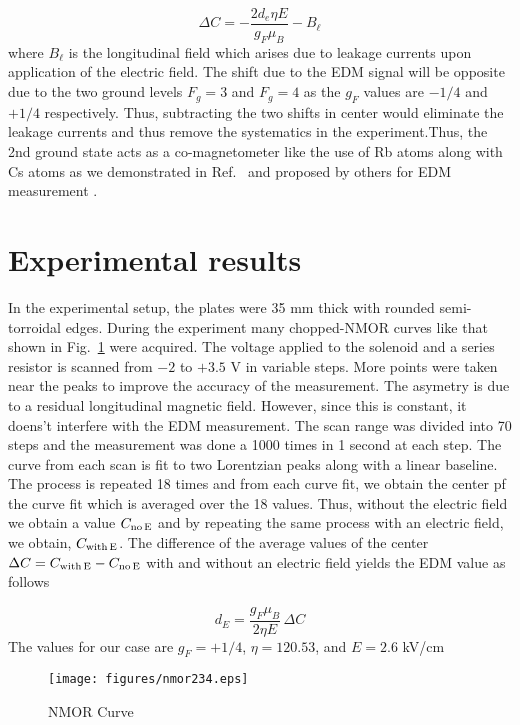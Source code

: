 \begin{equation*}
\Delta C = - \dfrac{2 d_e \eta E}{g_F \mu_B} - B_\ell
\end{equation*}
where $B_\ell$ is the longitudinal field which arises due to leakage currents upon application of the electric field. The shift due to the EDM signal will be opposite due to the two ground levels $F_g=3$ and $F_g=4$ as the $ g_F $ values are $-1/4$ and $+1/4$ respectively. Thus, subtracting the two shifts in center would eliminate the leakage currents and thus remove the systematics in the experiment.Thus, the 2nd ground state acts as a co-magnetometer like the use of Rb atoms along with Cs atoms as we demonstrated in Ref.\ \cite{RCN11} and proposed by others for EDM measurement \cite{CLV01}.

\section{Experimental results}

In the experimental setup, the plates were 35 mm thick with rounded semi-torroidal edges. During the experiment many chopped-NMOR curves like that shown in Fig.\ \ref{fig:nmor} were acquired. The voltage applied to the solenoid and a series resistor  is scanned from $ -2 $ to $ +3.5 $ V in variable steps. More points were taken near the peaks to improve the accuracy of the measurement. The asymetry is due to a residual longitudinal magnetic field. However, since this is constant, it doens't interfere with the EDM measurement. The scan range was divided into 70 steps and the measurement was done a 1000 times in 1 second at each step. The curve from each scan is fit to two Lorentzian peaks along with a linear baseline. The process is repeated 18 times and from each curve fit, we obtain the center pf the curve fit which is averaged over the 18 values. Thus, without the electric field we obtain a value $ C_{\rm no \, E} $ and by repeating the same process with an electric field, we obtain, $ C_{\rm with \, E} $. The difference of the average values of the center $ \Delta C = C_{\rm with \, E} - C_{\rm no \, E} $ with and without an electric field yields the EDM value as follows

\begin{equation*}
d_E = \dfrac{g_F \mu_B}{2 \eta E} \, \Delta C
\end{equation*}
The values for our case are $ g_F = +1/4 $, $ \eta = 120.53$, and $ E = 2.6 $ kV/cm

\begin{figure}
\centering
\texttt{[image: figures/nmor234.eps]}
\caption{NMOR Curve}
\label{fig:nmor}
\end{figure}

